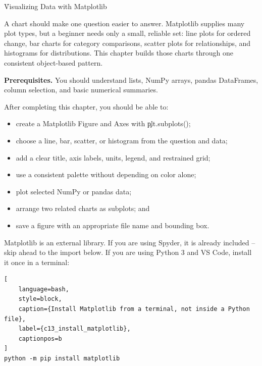 
\h{Visualizing Data with Matplotlib}
\label{ch:13}

A chart should make one question easier to answer. Matplotlib supplies many
plot types, but a beginner needs only a small, reliable set: line plots for
ordered change, bar charts for category comparisons, scatter plots for
relationships, and histograms for distributions. This chapter builds those
charts through one consistent object-based pattern.

\begin{NoteBox}
\textbf{Prerequisites.} You should understand lists, NumPy arrays, pandas
DataFrames, column selection, and basic numerical summaries.
\end{NoteBox}

\begin{tcolorbox}[title=Learning outcomes,colframe=orange,colback=white,arc=2mm]
After completing this chapter, you should be able to:
\begin{itemize}
    \item create a Matplotlib Figure and Axes with \c{plt.subplots()};
    \item choose a line, bar, scatter, or histogram from the question and data;
    \item add a clear title, axis labels, units, legend, and restrained grid;
    \item use a consistent palette without depending on color alone;
    \item plot selected NumPy or pandas data;
    \item arrange two related charts as subplots; and
    \item save a figure with an appropriate file name and bounding box.
\end{itemize}
\end{tcolorbox}


Matplotlib is an external library. If you are using Spyder, it is already
included -- skip ahead to the import below. If you are using Python 3 and
VS Code, install it once in a terminal:

\begin{lstlisting}[
    language=bash,
    style=block,
    caption={Install Matplotlib from a terminal, not inside a Python file},
    label={c13_install_matplotlib},
    captionpos=b
]
python -m pip install matplotlib
\end{lstlisting}

